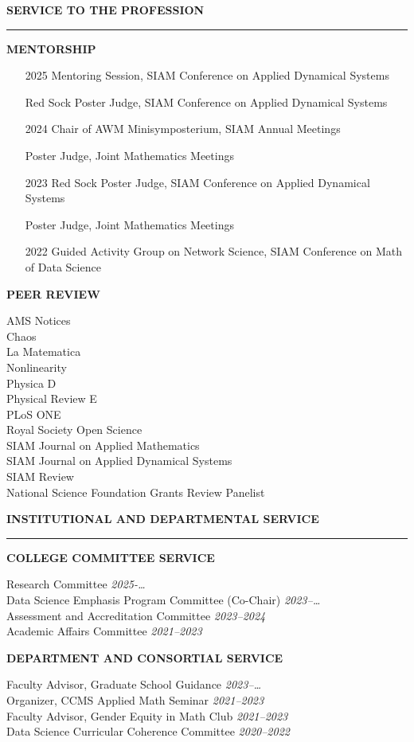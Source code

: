 \documentclass{resume} %
\renewenvironment{rSection}[1]{
\sectionskip
\textcolor{WinePurple}{\MakeUppercase{#1}}
\sectionlineskip
\hrule
\begin{list}{}{
\setlength{\leftmargin}{1.5em}
}
\item[]
}{
\end{list}
}
\begin{document}
\begin{rSection}{\bf Service to the Profession}
\uppercase{{\bf Mentorship}}
\begin{itemize}
    \item[2025] Mentoring Session, 
    SIAM Conference on Applied Dynamical Systems 
    \item[] Red Sock Poster Judge, 
    SIAM Conference on Applied Dynamical Systems 
    \item[2024] Chair of AWM Minisymposterium, 
    SIAM Annual Meetings 
    \item[] Poster Judge, 
    Joint Mathematics Meetings
    \item[2023] Red Sock Poster Judge, 
    SIAM Conference on Applied Dynamical Systems
    \item[] Poster Judge, 
    Joint Mathematics Meetings
    \item[2022] Guided Activity Group on Network Science,
    SIAM Conference on Math of Data Science 
\end{itemize}

\uppercase{{\bf Peer Review}}

    AMS Notices \\
    Chaos \\
    La Matematica \\
    Nonlinearity \\
    Physica D \\
    Physical Review E \\
    PLoS ONE \\
    Royal Society Open Science \\
    SIAM Journal on Applied Mathematics \\
    SIAM Journal on Applied Dynamical Systems \\
    SIAM Review \\
    National Science Foundation Grants Review Panelist
\end{rSection}

\begin{rSection}{\bf Institutional and Departmental Service}

\medskip

\uppercase{{\bf College Committee Service}}

Research Committee \hfill {\em 2025-\dots}
\\
Data Science Emphasis Program Committee (Co-Chair)  \hfill {\em 2023--\dots} 
\\
Assessment and Accreditation Committee \hfill {\em 2023--2024}
\\
Academic Aﬀairs Committee
\hfill {\em 2021--2023}

\uppercase{{\bf Department and Consortial Service}}

Faculty Advisor, Graduate School Guidance \hfill {\em 2023--\dots}
\\
Organizer, CCMS Applied Math Seminar \hfill {\em 2021--2023}
\\
Faculty Advisor, Gender Equity in Math Club \hfill {\em 2021--2023}
\\
Data Science Curricular Coherence Committee \hfill {\em 2020--2022}

\end{rSection}

\end{document}
